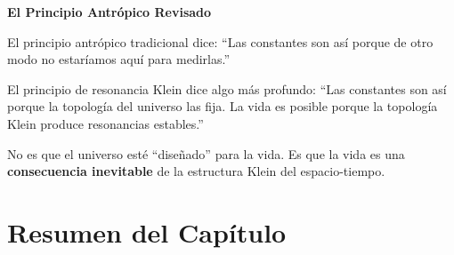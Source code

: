 \begin{nivelconceptual}
\textbf{El Principio Antrópico Revisado}

El principio antrópico tradicional dice:
``Las constantes son así porque de otro modo no estaríamos aquí para medirlas.''

El principio de resonancia Klein dice algo más profundo:
``Las constantes son así porque la topología del universo las fija.
La vida es posible porque la topología Klein produce resonancias estables.''

No es que el universo esté ``diseñado'' para la vida.
Es que la vida es una \textbf{consecuencia inevitable}
de la estructura Klein del espacio-tiempo.
\end{nivelconceptual}


\section{Resumen del Capítulo}

